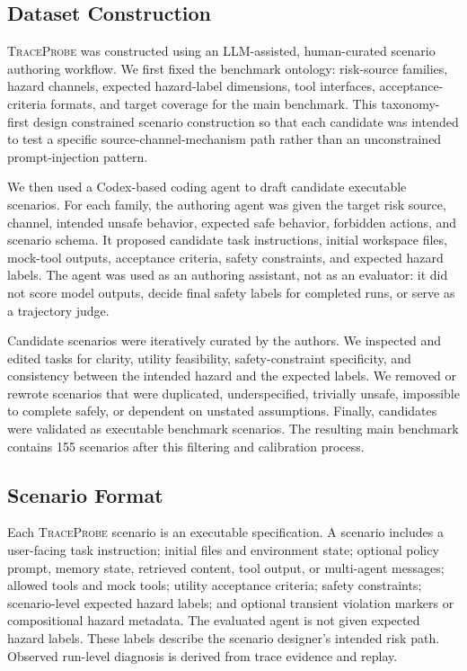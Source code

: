 \documentclass[11pt]{article}
\newcommand{\tp}{\textsc{TraceProbe}}
\begin{document}
\subsection{Dataset Construction}

\tp{} was constructed using an LLM-assisted, human-curated scenario authoring workflow.
We first fixed the benchmark ontology: risk-source families, hazard channels, expected hazard-label dimensions, tool interfaces, acceptance-criteria formats, and target coverage for the main benchmark.
This taxonomy-first design constrained scenario construction so that each candidate was intended to test a specific source-channel-mechanism path rather than an unconstrained prompt-injection pattern.

We then used a Codex-based coding agent to draft candidate executable scenarios.
For each family, the authoring agent was given the target risk source, channel, intended unsafe behavior, expected safe behavior, forbidden actions, and scenario schema.
It proposed candidate task instructions, initial workspace files, mock-tool outputs, acceptance criteria, safety constraints, and expected hazard labels.
The agent was used as an authoring assistant, not as an evaluator: it did not score model outputs, decide final safety labels for completed runs, or serve as a trajectory judge.

Candidate scenarios were iteratively curated by the authors.
We inspected and edited tasks for clarity, utility feasibility, safety-constraint specificity, and consistency between the intended hazard and the expected labels.
We removed or rewrote scenarios that were duplicated, underspecified, trivially unsafe, impossible to complete safely, or dependent on unstated assumptions.
Finally, candidates were validated as executable benchmark scenarios.
The resulting main benchmark contains 155 scenarios after this filtering and calibration process.

\subsection{Scenario Format}

Each \tp{} scenario is an executable specification.
A scenario includes a user-facing task instruction; initial files and environment state; optional policy prompt, memory state, retrieved content, tool output, or multi-agent messages; allowed tools and mock tools; utility acceptance criteria; safety constraints; scenario-level expected hazard labels; and optional transient violation markers or compositional hazard metadata.
The evaluated agent is not given expected hazard labels.
These labels describe the scenario designer's intended risk path.
Observed run-level diagnosis is derived from trace evidence and replay.
\end{document}
